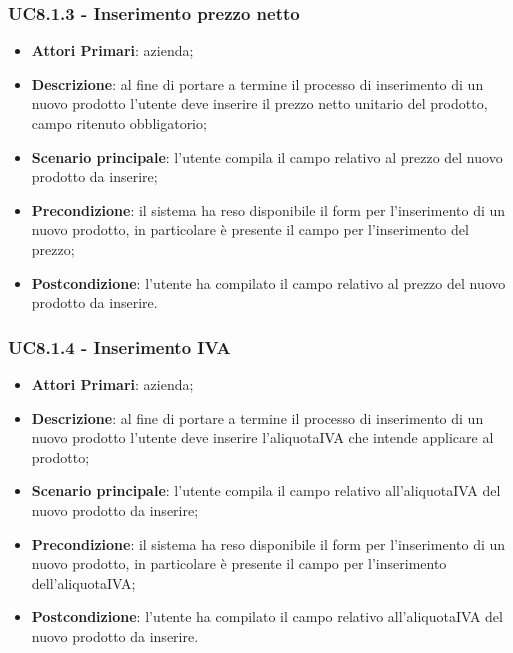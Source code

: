 \subsubsection{UC8.1.3 - Inserimento prezzo netto}
\begin{itemize}
	\item \textbf{Attori Primari}: azienda;
	\item \textbf{Descrizione}: al fine di portare a termine il processo di inserimento di un nuovo prodotto l'utente deve inserire il prezzo netto unitario del prodotto, campo ritenuto obbligatorio;
	\item \textbf{Scenario principale}: l'utente compila il campo relativo al prezzo del nuovo prodotto da inserire;
	\item \textbf{Precondizione}: il sistema ha reso disponibile il form per l'inserimento di un nuovo prodotto, in particolare è presente il campo per l'inserimento del prezzo;
	\item \textbf{Postcondizione}: l'utente ha compilato il campo relativo al prezzo del nuovo prodotto da inserire.
\end{itemize}
\subsubsection{UC8.1.4 - Inserimento IVA}
\begin{itemize}
	\item \textbf{Attori Primari}: azienda;
	\item \textbf{Descrizione}: al fine di portare a termine il processo di inserimento di un nuovo prodotto l'utente deve inserire l'aliquota\glosp IVA che intende applicare al prodotto;
	\item \textbf{Scenario principale}: l'utente compila il campo relativo all'aliquota\glosp IVA del nuovo prodotto da inserire;
	\item \textbf{Precondizione}: il sistema ha reso disponibile il form per l'inserimento di un nuovo prodotto, in particolare è presente il campo per l'inserimento dell'aliquota\glosp IVA;
	\item \textbf{Postcondizione}: l'utente ha compilato il campo relativo all'aliquota\glosp IVA del nuovo prodotto da inserire.
\end{itemize}
